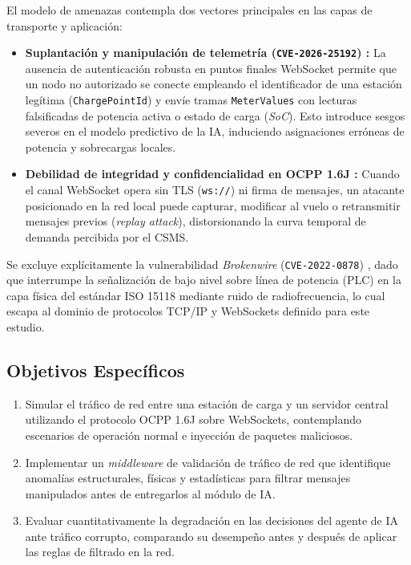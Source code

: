 \documentclass[conference]{IEEEtran}
\begin{document}
El modelo de amenazas contempla dos vectores principales en las capas de transporte y aplicación:
\begin{itemize}
    \item \textbf{Suplantación y manipulación de telemetría (\texttt{CVE-2026-25192}) \cite{nist2026}:} La ausencia de autenticación robusta en puntos finales WebSocket permite que un nodo no autorizado se conecte empleando el identificador de una estación legítima (\texttt{ChargePointId}) y envíe tramas \texttt{MeterValues} con lecturas falsificadas de potencia activa o estado de carga (\textit{SoC}). Esto introduce sesgos severos en el modelo predictivo de la IA, induciendo asignaciones erróneas de potencia y sobrecargas locales.
    \item \textbf{Debilidad de integridad y confidencialidad en OCPP 1.6J \cite{alcaraz2017,elmo2023}:} Cuando el canal WebSocket opera sin TLS (\texttt{ws://}) ni firma de mensajes, un atacante posicionado en la red local puede capturar, modificar al vuelo o retransmitir mensajes previos (\textit{replay attack}), distorsionando la curva temporal de demanda percibida por el CSMS.
\end{itemize}

Se excluye explícitamente la vulnerabilidad \textit{Brokenwire} (\texttt{CVE-2022-0878}) \cite{kohler2023}, dado que interrumpe la señalización de bajo nivel sobre línea de potencia (PLC) en la capa física del estándar ISO 15118 mediante ruido de radiofrecuencia, lo cual escapa al dominio de protocolos TCP/IP y WebSockets definido para este estudio.

\subsection{Objetivos Específicos}

\begin{enumerate}
    \item Simular el tráfico de red entre una estación de carga y un servidor central utilizando el protocolo OCPP 1.6J sobre WebSockets, contemplando escenarios de operación normal e inyección de paquetes maliciosos.
    \item Implementar un \textit{middleware} de validación de tráfico de red que identifique anomalías estructurales, físicas y estadísticas para filtrar mensajes manipulados antes de entregarlos al módulo de IA.
    \item Evaluar cuantitativamente la degradación en las decisiones del agente de IA ante tráfico corrupto, comparando su desempeño antes y después de aplicar las reglas de filtrado en la red.
\end{enumerate}
\end{document}
